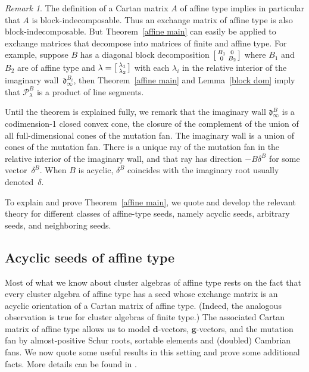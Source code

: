 \documentclass{amsart}
\theoremstyle{definition}
\theoremstyle{remark}
\newtheorem{remark}[proposition]{Remark}
\numberwithin{equation}{section}
\newcommand{\0}{{\mathbf{0}}}
\newcommand{\Cone}{\mathrm{Cone}}
\newcommand{\Proj}{\mathrm{Proj}}
\newcommand{\g}{\mathbf{g}}
\newcommand{\tB}{{\widetilde{B}}}
\renewcommand{\P}{\mathcal{P}}
\renewcommand{\d}{{\mathfrak d}}
\newcommand{\dd}{{\mathbf d}}
\begin{document}
\begin{remark}\label{indecomposable}
The definition of a Cartan matrix $A$ of affine type implies in particular that $A$ is block-indecomposable.
Thus an exchange matrix of affine type is also block-indecomposable.
But Theorem~\ref{affine main} can easily be applied to exchange matrices that decompose into matrices of finite and affine type.
For example, suppose $B$ has a diagonal block decomposition $\begin{bsmallmatrix}B_1&0\\0&B_2\end{bsmallmatrix}$ where $B_1$ and $B_2$ are of affine type and $\lambda=\begin{bsmallmatrix}\lambda_1\\\lambda_2\end{bsmallmatrix}$ with each $\lambda_i$ in the relative interior of the imaginary wall~$\d^{B_i}_\infty$, then Theorem~\ref{affine main} and Lemma~\ref{block dom} imply that $\P_\lambda^B$ is a product of line segments.

\end{remark}

Until the theorem is explained fully, we remark that the imaginary wall $\d^B_\infty$ is a codimension-1 closed convex cone, the closure of the complement of the union of all full-dimensional cones of the mutation fan.
The imaginary wall is a union of cones of the mutation fan.
There is a unique ray of the mutation fan in the relative interior of the imaginary wall, and that ray has direction $-B\delta^B$ for some vector~$\delta^B$.
When $B$ is acyclic, $\delta^B$ coincides with the imaginary root usually denoted~$\delta$.

To explain and prove Theorem~\ref{affine main}, we quote and develop the relevant theory for different classes of affine-type seeds, namely acyclic seeds, arbitrary seeds, and neighboring seeds.

\subsection{Acyclic seeds of affine type}\label{acyc sec}
Most of what we know about cluster algebras of affine type rests on the fact that every cluster algebra of affine type has a seed whose exchange matrix is an acyclic orientation of a Cartan matrix of affine type.
(Indeed, the analogous observation is true for cluster algebras of finite type.)
The associated Cartan matrix of affine type allows us to model $\dd$-vectors, $\g$-vectors, and the mutation fan by almost-positive Schur roots, sortable elements and (doubled) Cambrian fans.
We now quote some useful results in this setting and prove some additional facts.
More details can be found in \cite{affdenom,framework,afframe,affscat}.
\end{document}

